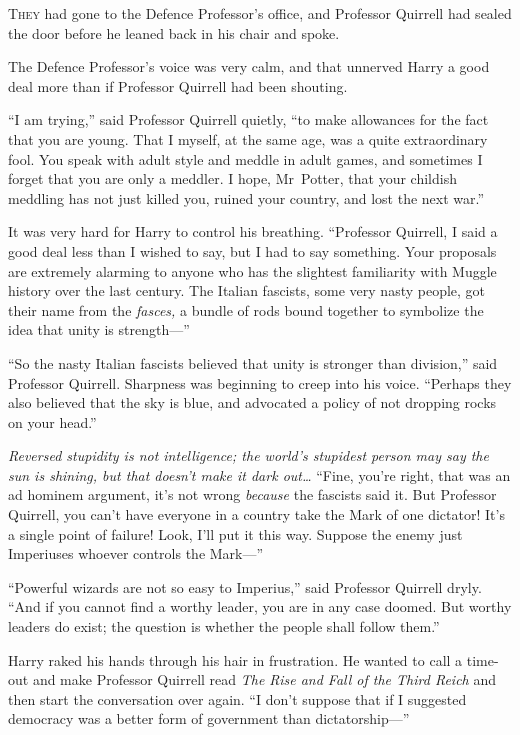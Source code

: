 
\lettrine{T}{hey} had gone to
the Defence Professor’s office, and Professor Quirrell had sealed the door before he leaned back in his chair and spoke.

The Defence Professor’s voice was very calm, and that unnerved Harry a good deal more than if Professor Quirrell had been shouting.

“I am trying,” said Professor Quirrell quietly, “to make allowances for the fact that you are young. That I myself, at the same age, was a quite extraordinary fool. You speak with adult style and meddle in adult games, and sometimes I forget that you are only a meddler. I hope, Mr~Potter, that your childish meddling has not just killed you, ruined your country, and lost the next war.”

It was very hard for Harry to control his breathing. “Professor Quirrell, I said a good deal less than I wished to say, but I had to say something. Your proposals are extremely alarming to anyone who has the slightest familiarity with Muggle history over the last century. The Italian fascists, some very nasty people, got their name from the \emph{fasces,} a bundle of rods bound together to symbolize the idea that unity is strength—”

“So the nasty Italian fascists believed that unity is stronger than division,” said Professor Quirrell. Sharpness was beginning to creep into his voice. “Perhaps they also believed that the sky is blue, and advocated a policy of not dropping rocks on your head.”

\emph{Reversed stupidity is not intelligence; the world’s stupidest person may say the sun is shining, but that doesn’t make it dark out…} “Fine, you’re right, that was an ad hominem argument, it’s not wrong \emph{because} the fascists said it. But Professor Quirrell, you can’t have everyone in a country take the Mark of one dictator! It’s a single point of failure! Look, I’ll put it this way. Suppose the enemy just Imperiuses whoever controls the Mark—”

“Powerful wizards are not so easy to Imperius,” said Professor Quirrell dryly. “And if you cannot find a worthy leader, you are in any case doomed. But worthy leaders do exist; the question is whether the people shall follow them.”

Harry raked his hands through his hair in frustration. He wanted to call a time-out and make Professor Quirrell read \emph{The Rise and Fall of the Third Reich} and then start the conversation over again. “I don’t suppose that if I suggested democracy was a better form of government than dictatorship—”

